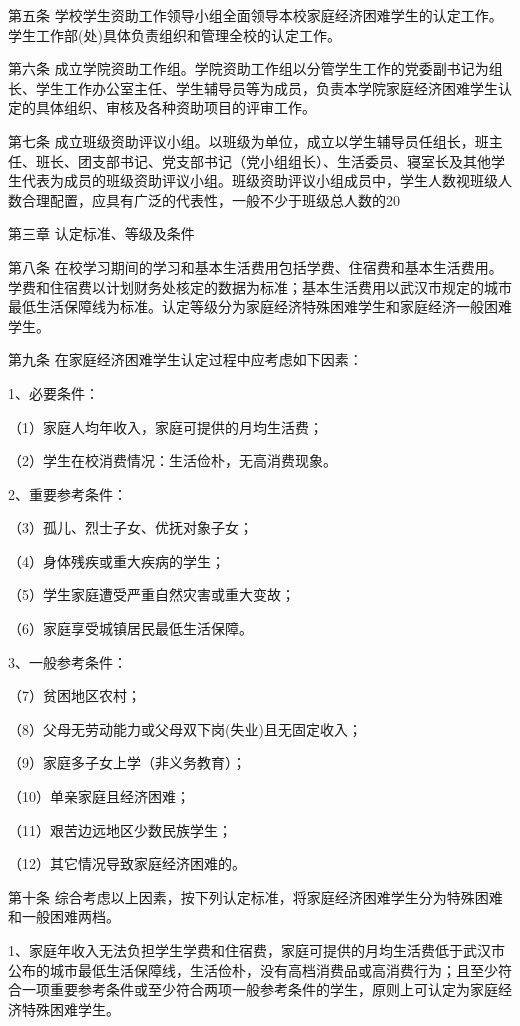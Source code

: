 \documentclass[UTF8,12pt,a4paper]{report}
\begin{document}
第五条 学校学生资助工作领导小组全面领导本校家庭经济困难学生的认定工作。学生工作部(处)具体负责组织和管理全校的认定工作。

第六条 成立学院资助工作组。学院资助工作组以分管学生工作的党委副书记为组长、学生工作办公室主任、学生辅导员等为成员，负责本学院家庭经济困难学生认定的具体组织、审核及各种资助项目的评审工作。

第七条 成立班级资助评议小组。以班级为单位，成立以学生辅导员任组长，班主任、班长、团支部书记、党支部书记（党小组组长）、生活委员、寝室长及其他学生代表为成员的班级资助评议小组。班级资助评议小组成员中，学生人数视班级人数合理配置，应具有广泛的代表性，一般不少于班级总人数的20%

第三章 认定标准、等级及条件

第八条 在校学习期间的学习和基本生活费用包括学费、住宿费和基本生活费用。学费和住宿费以计划财务处核定的数据为标准；基本生活费用以武汉市规定的城市最低生活保障线为标准。认定等级分为家庭经济特殊困难学生和家庭经济一般困难学生。

第九条 在家庭经济困难学生认定过程中应考虑如下因素：

1、必要条件：

（1）家庭人均年收入，家庭可提供的月均生活费；

（2）学生在校消费情况：生活俭朴，无高消费现象。

2、重要参考条件：

（3）孤儿、烈士子女、优抚对象子女；

（4）身体残疾或重大疾病的学生；

（5）学生家庭遭受严重自然灾害或重大变故；

（6）家庭享受城镇居民最低生活保障。

3、一般参考条件：

（7）贫困地区农村；

（8）父母无劳动能力或父母双下岗(失业)且无固定收入；

（9）家庭多子女上学（非义务教育）；

（10）单亲家庭且经济困难；

（11）艰苦边远地区少数民族学生；

（12）其它情况导致家庭经济困难的。

第十条 综合考虑以上因素，按下列认定标准，将家庭经济困难学生分为特殊困难和一般困难两档。

1、家庭年收入无法负担学生学费和住宿费，家庭可提供的月均生活费低于武汉市公布的城市最低生活保障线，生活俭朴，没有高档消费品或高消费行为；且至少符合一项重要参考条件或至少符合两项一般参考条件的学生，原则上可认定为家庭经济特殊困难学生。
\end{document}
